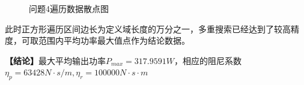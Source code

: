 \documentclass{article}
\numberwithin{equation}{subsection}
\begin{document}
\begin{figure}[htbp]
    \centering
    \quad
    \caption{问题4遍历数据散点图}
\end{figure}
此时正方形遍历区间边长为定义域长度的万分之一，多重搜索已经达到了较高精度，可取范围内平均功率最大值点作为结论数据。

\textbf{【结论】}最大平均输出功率$P_{max}=317.9591W$，相应的阻尼系数$\eta_p=63428N·s/m,\eta _r=100000N·s·m$
\end{document}
